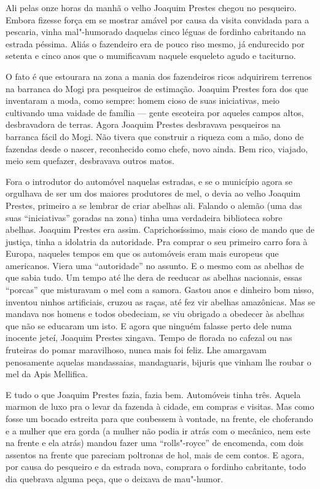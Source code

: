 \begin{linenumbers}
Ali pelas onze horas da manhã o velho Joaquim Prestes chegou no
pesqueiro. Embora fizesse força em se mostrar amável por causa da visita
convidada para a pescaria, vinha mal"-humorado daquelas cinco léguas de
fordinho cabritando na estrada péssima. Aliás o fazendeiro era de pouco
riso mesmo, já endurecido por setenta e cinco anos que o mumificavam
naquele esqueleto agudo e taciturno.

O fato é que estourara na zona a mania dos fazendeiros ricos adquirirem
terrenos na barranca do Mogi pra pesqueiros de estimação. Joaquim
Prestes fora dos que inventaram a moda, como sempre: homem cioso de suas
iniciativas, meio cultivando uma vaidade de família --- gente escoteira
por aqueles campos altos, desbravadora de terras. Agora Joaquim Prestes
desbravava pesqueiros na barranca fácil do Mogi. Não tivera que
construir a riqueza com a mão, dono de fazendas desde o nascer,
reconhecido como chefe, novo ainda. Bem rico, viajado, meio sem
quefazer, desbravava outros matos.

Fora o introdutor do automóvel naquelas estradas, e se o município agora
se orgulhava de ser um dos maiores produtores de mel, o devia ao velho
Joaquim Prestes, primeiro a se lembrar de criar abelhas ali. Falando o
alemão (uma das suas ``iniciativas'' goradas na zona) tinha uma
verdadeira biblioteca sobre abelhas. Joaquim Prestes era assim.
Caprichosíssimo, mais cioso de mando que de justiça, tinha a idolatria
da autoridade. Pra comprar o seu primeiro carro fora à Europa, naqueles
tempos em que os automóveis eram mais europeus que americanos. Viera uma
``autoridade'' no assunto. E o mesmo com as abelhas de que sabia tudo.
Um tempo até lhe dera de reeducar as abelhas nacionais, essas ``porcas''
que misturavam o mel com a samora. Gastou anos e dinheiro bom nisso,
inventou ninhos artificiais, cruzou as raças, até fez vir abelhas
amazônicas. Mas se mandava nos homens e todos obedeciam, se viu obrigado
a obedecer às abelhas que não se educaram um isto. E agora que ninguém
falasse perto dele numa inocente jeteí, Joaquim Prestes xingava. Tempo
de florada no cafezal ou nas fruteiras do pomar maravilhoso, nunca mais
foi feliz. Lhe amargavam penosamente aquelas mandassaias, mandaguaris,
bijuris que vinham lhe roubar o mel da Apis Mellifica.

E tudo o que Joaquim Prestes fazia, fazia bem. Automóveis tinha três.
Aquela marmon de luxo pra o levar da fazenda à cidade, em compras e
visitas. Mas como fosse um bocado estreita para que coubessem à vontade,
na frente, ele choferando e a mulher que era gorda (a mulher não podia
ir atrás com o mecânico, nem este na frente e ela atrás) mandou fazer
uma ``rolls"-royce'' de encomenda, com dois assentos na frente que
pareciam poltronas de hol, mais de cem contos. E agora, por causa do
pesqueiro e da estrada nova, comprara o fordinho cabritante, todo dia
quebrava alguma peça, que o deixava de mau"-humor.


\end{linenumbers}
